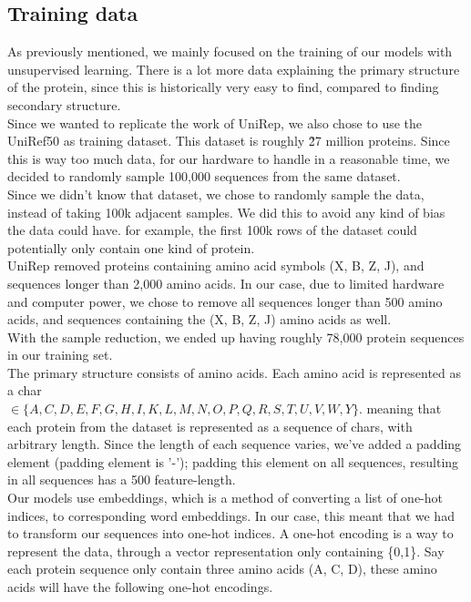 \subsection{Training data}
As previously mentioned, we mainly focused on the training of our models with unsupervised learning. There is a lot more data explaining the primary structure of the protein, since this is historically very easy to find, compared to finding secondary structure. \\

\noindent
Since we wanted to replicate the work of UniRep, we also chose to use the UniRef50 as training dataset. This dataset is roughly \~27 million proteins. Since this is way too much data, for our hardware to handle in a reasonable time, we decided to randomly sample 100,000 sequences from the same dataset. \\
Since we didn't know that dataset, we chose to randomly sample the data, instead of taking 100k adjacent samples. We did this to avoid any kind of bias the data could have. for example, the first 100k rows of the dataset could potentially only contain one kind of protein.\\

\noindent
UniRep removed proteins containing amino acid symbols (X, B, Z, J), and sequences longer than 2,000 amino acids\cite{unirep}. In our case, due to limited hardware and computer power, we chose to remove all sequences longer than 500 amino acids, and sequences containing the (X, B, Z, J) amino acids as well.\\

\noindent
With the sample reduction, we ended up having roughly 78,000 protein sequences in our training set.\\

\noindent
The primary structure consists of amino acids. Each amino acid is represented as a char \\ $\in \{A, C, D, E, F, G, H, I, K, L, M, N, O, P, Q, R, S, T, U, V, W, Y\}$. meaning that each protein from the dataset is represented as a sequence of chars, with arbitrary length. Since the length of each sequence varies, we've added a padding element (padding element is '-'); padding this element on all sequences, resulting in all sequences has a 500 feature-length. \\

\noindent
Our models use embeddings, which is a method of converting a list of one-hot indices, to corresponding word embeddings. In our case, this meant that we had to transform our sequences into one-hot indices. A one-hot encoding is a way to represent the data, through a vector representation only containing \{0,1\}. Say each protein sequence only contain three amino acids (A, C, D), these amino acids will have the following one-hot encodings.

